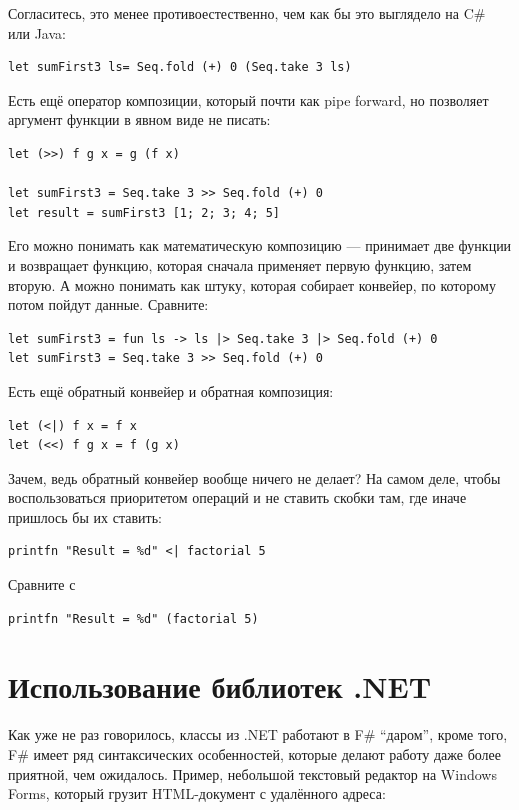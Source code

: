\documentclass[a5paper]{article}
\begin{document}
Согласитесь, это менее противоестественно, чем как бы это выглядело на C\# или Java:

\begin{verbatim}
let sumFirst3 ls= Seq.fold (+) 0 (Seq.take 3 ls)
\end{verbatim}

Есть ещё оператор композиции, который почти как pipe forward, но позволяет аргумент функции в явном виде не писать:

\begin{verbatim}
let (>>) f g x = g (f x)

let sumFirst3 = Seq.take 3 >> Seq.fold (+) 0
let result = sumFirst3 [1; 2; 3; 4; 5]
\end{verbatim}

Его можно понимать как математическую композицию --- принимает две функции и возвращает функцию, которая сначала применяет первую функцию, затем вторую. А можно понимать как штуку, которая собирает конвейер, по которому потом пойдут данные. Сравните: 

\begin{verbatim}
let sumFirst3 = fun ls -> ls |> Seq.take 3 |> Seq.fold (+) 0
let sumFirst3 = Seq.take 3 >> Seq.fold (+) 0
\end{verbatim}

Есть ещё обратный конвейер и обратная композиция:

\begin{verbatim}
let (<|) f x = f x
let (<<) f g x = f (g x)
\end{verbatim}

Зачем, ведь обратный конвейер вообще ничего не делает? На самом деле, чтобы воспользоваться приоритетом операций и не ставить скобки там, где иначе пришлось бы их ставить:

\begin{verbatim}
printfn "Result = %d" <| factorial 5
\end{verbatim}

Сравните с

\begin{verbatim}
printfn "Result = %d" (factorial 5)
\end{verbatim}

\section{Использование библиотек .NET}

Как уже не раз говорилось, классы из .NET работают в F\# ``даром'', кроме того, F\# имеет ряд синтаксических особенностей, которые делают работу даже более приятной, чем ожидалось. Пример, небольшой текстовый редактор на Windows Forms, который грузит HTML-документ с удалённого адреса:
\end{document}
